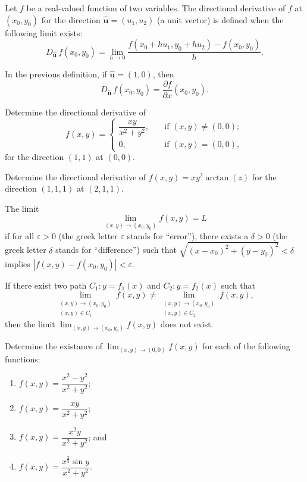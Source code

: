 \documentclass[11pt]{article}
\theoremstyle{break}
\newcommand{\dirderivative}[1]{D_{#1}\!\,}
\newcommand{\pderivative}[2]{\dfrac{\partial {#1}}{\partial {#2}}}
\newcommand{\bfu}{\textbf{u}}
\numberwithin{equation}{theorem}
\begin{document}
\begin{definition}
    Let $f$ be a real-valued function of two variables. The directional derivative of $f$ at $(x_0, y_0)$ for the direction $\hat{\bfu}= (u_1, u_2)$ (a unit vector) is defined when the following limit exists:
    $$\dirderivative{\hat{\bfu}}f(x_0, y_0)=\lim_{h\to 0}\dfrac{f(x_0+hu_1, y_0+hu_2)-f(x_0, y_0)}{h}.$$
\end{definition}

\begin{remark}
    In the previous definition, if $\hat{\bfu}=(1, 0)$, then $$\dirderivative{\hat{\bfu}}f(x_0, y_0)=\pderivative{f}{x}(x_0, y_0).$$
\end{remark}

\begin{example}
    Determine the directional derivative of $$f(x, y)=\left\{\begin{array}{ll}
        \dfrac{xy}{x^2+y^2}, \quad&\text{if\ }(x, y)\ne(0, 0);\\
        0, &\text{if\ }(x, y)=(0, 0),
    \end{array}\right.$$
    for the direction $(1, 1)$ at $(0, 0)$.
\end{example}

\begin{example}
    Determine the directional derivative of $f(x, y)=xy^2\arctan(z)$ for the direction $(1, 1, 1)$ at $(2, 1, 1)$.
\end{example}

\begin{definition}[Limit]
    The limit $$\lim_{(x, y)\to(x_0, y_0)}f(x, y)=L$$ if for all $\varepsilon>0$ (the greek letter $\varepsilon$ stands for ``error''), there exists a $\delta>0$ (the greek letter $\delta$ stands for ``difference'') such that $\sqrt{(x-x_0)^2+(y-y_0)^2}<\delta$ implies $|f(x, y)-f(x_0, y_0)|<\varepsilon$.
\end{definition}

\begin{remark}
    If there exist two path $C_1: y=f_1(x)$ and $C_2: y=f_2(x)$ such that $$\lim_{\substack{(x, y)\to(x_0, y_0)\\(x, y)\in C_1}}f(x, y)\ne\lim_{\substack{(x, y)\to(x_0, y_0)\\(x, y)\in C_2}}f(x, y),$$ then the limit $\displaystyle\lim_{(x, y)\to(x_0, y_0)}f(x, y)$ does not exist.
\end{remark}

\newpage
\begin{example}
    Determine the existance of $\displaystyle\lim_{(x, y)\to(0, 0)}f(x, y)$ for each of the following functions:
    \begin{enumerate}
        \item $f(x, y)=\dfrac{x^2-y^2}{x^2+y^2}$;
        \item $f(x, y)=\dfrac{xy}{x^2+y^2}$;
        \item $f(x, y)=\dfrac{x^2y}{x^2+y^2}$; and
        \item $f(x, y)=\dfrac{x^\frac{2}{3}\sin y}{x^2+y^2}$.
    \end{enumerate}
\end{example}
\end{document}
